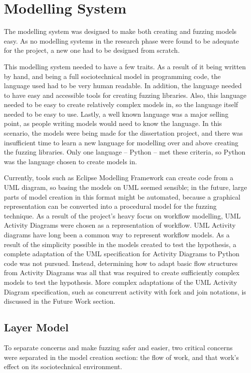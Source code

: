 \section{Modelling System}
\label{model_outline}
The modelling system was designed to make both creating and fuzzing models easy. As no modelling systems in the research phase were found to be adequate for the project, a new one had to be designed from scratch.\par
This modelling system needed to have a few traits. As a result of it being written by hand, and being a full sociotechnical model in programming code, the language used had to be very human readable. In addition, the language needed to have easy and accessible tools for creating fuzzing libraries. Also, this language needed to be easy to create relatively complex models in, so the language itself needed to be easy to use. Lastly, a well known language was a major selling point, as people writing models would need to know the language. In this scenario, the models were being made for the dissertation project, and there was insufficient time to learn a new language for modelling over and above creating the fuzzing libraries. Only one language -- Python -- met these criteria, so Python was the language chosen to create models in. \par%
Currently, tools such as Eclipse Modelling Framework\cite{EMFManual} can create code from a UML diagram, so basing the models on UML seemed sensible; in the future, large parts of model creation in this format might be automated, because a graphical representation can be converted into a procedural model for the fuzzing technique. As a result of the project's heavy focus on workflow modelling, UML Activity Diagrams\cite{Omg2010} were chosen as a representation of workflow. UML Activity diagrams have long been a common way to represent workflow models\cite{Gogolla2001}. As a result of the simplicity possible in the models created to test the hypothesis, a complete adaptation of the UML specification for Activity Diagrams to Python code was not pursued. Instead, determining how to adapt basic flow structures from Activity Diagrams was all that was required to create sufficiently complex models to test the hypothesis. More complex adaptations of the UML Activity Diagram specification, such as concurrent activity with fork and join notations, is discussed in the Future Work section. \par%
\subsection{Layer Model}%
To separate concerns and make fuzzing safer and easier, two critical concerns were separated in the model creation section: the flow of work, and that work's effect on its sociotechnical environment. \par
